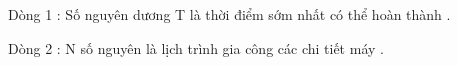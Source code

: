 Dòng 1 : Số nguyên dương T là thời điểm sớm nhất có thể hoàn thành .   


   Dòng 2 : N số nguyên là lịch trình gia công các chi tiết máy .